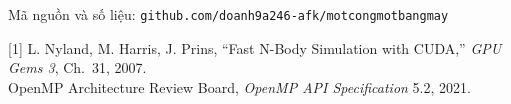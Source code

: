 \documentclass[aspectratio=169,11pt]{beamer}
\newcommand{\nguoi}{}
\newcommand{\nguoinoi}[1]{\renewcommand{\nguoi}{#1}}
\newcommand{\code}[1]{\texttt{\color{navy}#1}}
\begin{document}
\nguoinoi{}
\begin{frame}[plain]
\centering\vfill
{}\par
\vspace{18pt}
{\small Mã nguồn và số liệu: \code{github.com/doanh9a246-afk/motcongmotbangmay}}\par
\vspace{18pt}
{\scriptsize\color{gray}
[1] L. Nyland, M. Harris, J. Prins, ``Fast N-Body Simulation with CUDA,'' \emph{GPU Gems 3}, Ch.~31, 2007.\\ \relax
[2] OpenMP Architecture Review Board, \emph{OpenMP API Specification} 5.2, 2021.}
\vfill
\end{frame}
\end{document}

